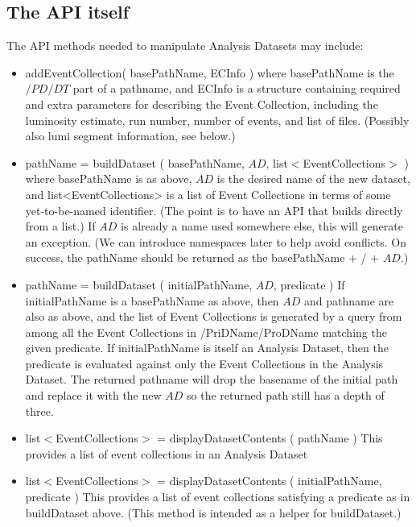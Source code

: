 \documentclass{cmspaper}
\begin{document}
\subsection{The API itself}
  The API methods needed to manipulate Analysis Datasets may include: 
\begin{itemize}
\item addEventCollection( basePathName, ECInfo ) 
       where basePathName is the $/PD/DT$ part of a pathname, and ECInfo 
       is a structure containing required and extra parameters for describing 
       the Event Collection, including the luminosity estimate, run number, 
       number of events, and list of files.  (Possibly also lumi segment 
       information, see below.) 

\item pathName = buildDataset ( basePathName, $AD$, list$<$EventCollections$>$ )
       where basePathName is as above, $AD$ is the desired name of the new
       dataset,  and list<EventCollections> is a list of Event Collections in 
       terms of some yet-to-be-named identifier.  (The point is to have an API 
       that builds directly from a list.)  If $AD$ is already a name used 
       somewhere else, this will generate an exception.   (We can introduce 
       namespaces later to help avoid conflicts.  On success, the pathName 
       should be returned as the basePathName + / + $AD$.) 

\item  pathName = buildDataset ( initialPathName, $AD$, predicate )
       If initialPathName is a basePathName as above, then $AD$ and pathname 
       are also as above, and the list of Event Collections is generated by a
       query from among all the Event Collections in /PriDName/ProDName 
       matching the given predicate.  If initialPathName is itself an Analysis 
       Dataset, then the predicate is evaluated against only the Event 
       Collections in the Analysis Dataset.  The returned pathname will drop 
       the basename of the initial path and replace it with the new $AD$ so 
       the returned path still has a depth of three.  

\item  list$<$EventCollections$>$ = displayDatasetContents ( pathName ) 
       This provides a list of event collections in an Analysis Dataset 

\item  list$<$EventCollections$>$ = displayDatasetContents ( initialPathName, predicate ) 
       This provides a list of event collections satisfying a predicate as in 
       buildDataset above.  (This method is intended as a helper for 
       buildDataset.) 


\end{itemize}
\end{document}
